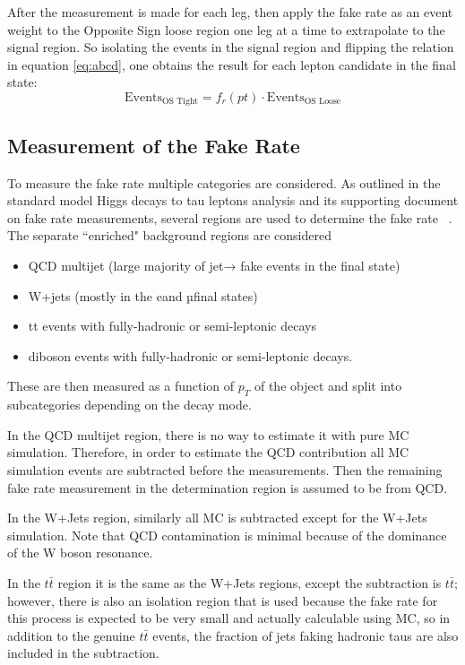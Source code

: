 After the measurement is made for each leg, then apply the fake rate as an event weight to the Opposite Sign loose region one leg at a time to extrapolate to the signal region. So isolating the events in the signal region and flipping the relation in equation \ref{eq:abcd}, one obtains the result for each lepton candidate in the final state: 
\begin{equation}
\text{Events}_\text{OS Tight} = f_r(pt)\cdot \text{Events}_\text{OS Loose}  
\end{equation}

\subsection{Measurement of the Fake Rate}
To measure the fake rate multiple categories are considered. As outlined in the standard model Higgs decays to tau leptons analysis and its supporting document on fake rate measurements, several regions are used to determine the fake rate ~\cite{AN16355}. The separate ``enriched" background regions are considered 
\begin{itemize}
	\item QCD multijet (large majority of jet→ \tauh fake events in the \tauh \tauh final state)
	\item W+jets (mostly in the e\tauh and µ\tauh final states)
	\item tt events with fully-hadronic or semi-leptonic decays
	\item diboson events with fully-hadronic or semi-leptonic decays.
\end{itemize} 


These are then measured as a function of $p_T$ of the object and split into subcategories depending on the decay mode.  

In the QCD multijet region, there is no way to estimate it with pure MC simulation. Therefore, in order to estimate the QCD contribution all MC simulation events are subtracted before the measurements. Then the remaining fake rate measurement in the determination region is assumed to be from QCD.

In the W+Jets region, similarly all MC is subtracted except for the W+Jets simulation. Note that QCD contamination is minimal because of the dominance of the W boson resonance. 

In the $t\bar{t}$ region it is the same as the W+Jets regions, except the subtraction is $t\bar{t}$; however, there is also an isolation region that is used because the fake rate for this process is expected to be very small and actually calculable using MC, so in addition to the genuine $t\bar{t}$ events, the fraction of jets faking hadronic taus are also included in the subtraction. 



